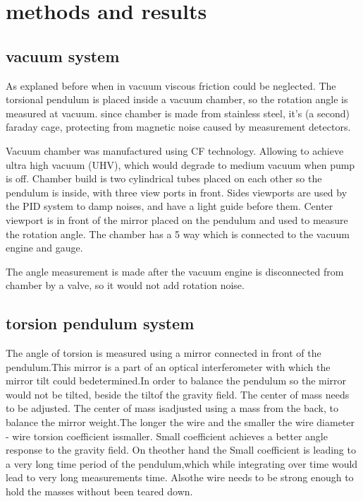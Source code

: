 \documentclass[\main/master.tex]{subfiles}
\begin{document}
\chapter{methods and results}\label{chp:example-2}
\section{vacuum system}
As explaned before when in vacuum viscous friction could be neglected. The torsional pendulum is placed inside a vacuum chamber, so the rotation angle is measured at vacuum.  since chamber is made from stainless steel, it's (a second) faraday cage, protecting from magnetic noise caused by measurement detectors.
\par
Vacuum chamber was manufactured using CF technology. Allowing to achieve ultra high vacuum (UHV), which would degrade to medium vacuum when pump is off. Chamber build is two cylindrical tubes placed on each other so the pendulum is inside, with three view ports in front. Sides viewports are used by the PID system to damp noises, and have a light guide before them. Center viewport is in front of the mirror placed on the pendulum and used to measure the rotation angle. The chamber has a 5 way which is connected to the vacuum engine and gauge.
\par
The angle measurement is made after the vacuum engine is disconnected from chamber by a valve, so it would not add rotation noise.






\section{torsion pendulum system}
The angle of torsion is measured using a mirror connected in front of the pendulum.This mirror is a part of an optical interferometer with which the mirror tilt could bedetermined.In order to balance the pendulum so the mirror would not be tilted, beside the tiltof the gravity field. The center of mass needs to be adjusted. The center of mass isadjusted using a mass from the back, to balance the mirror weight.The longer the wire and the smaller the wire diameter - wire torsion coefficient issmaller. Small coefficient achieves a better angle response to the gravity field. On theother hand the Small coefficient is leading to a very long time period of the pendulum,which while integrating over time would lead to very long measurements time. Alsothe wire needs to be strong enough to hold the masses without been teared down.
\end{document}
